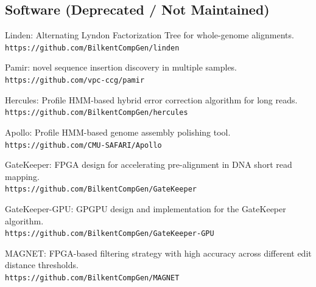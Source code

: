 \subsection{\small \sc Software (Deprecated / Not Maintained)}
\begin{list2}
\item 
Linden: Alternating Lyndon Factorization Tree for whole-genome alignments.\\
{\tt https://github.com/BilkentCompGen/linden}
\item
  Pamir: novel sequence insertion discovery in multiple samples.\\
  {\tt https://github.com/vpc-ccg/pamir}

\item
  Hercules: Profile HMM-based hybrid error correction algorithm for long reads.\\
  {\tt https://github.com/BilkentCompGen/hercules}
  \item
  Apollo: Profile HMM-based genome assembly polishing tool.\\
  {\tt https://github.com/CMU-SAFARI/Apollo}

\item
  GateKeeper: FPGA design for accelerating pre-alignment in DNA short read mapping.\\
  {\tt https://github.com/BilkentCompGen/GateKeeper}
  
  \item
  GateKeeper-GPU: GPGPU design and implementation for the GateKeeper algorithm.\\
  {\tt https://github.com/BilkentCompGen/GateKeeper-GPU}

\item
  MAGNET: FPGA-based filtering strategy with high accuracy across different edit distance thresholds.\\
  {\tt https://github.com/BilkentCompGen/MAGNET}
  

\end{list2}
